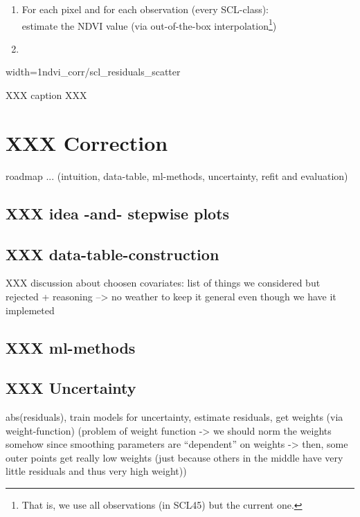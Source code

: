{    \begin{enumerate}
        \item For each pixel and for each observation (every SCL-class):\\
            estimate the NDVI value (via out-of-the-box interpolation\footnote{That is, we use all observations (in SCL45) but the current one.})
        \item
    \end{enumerate}







    \begin{my_figure}[h]{width=1\textwidth}{ndvi_corr/scl_residuals_scatter}
        \caption{XXX caption XXX}
        \label{fig:ndvi_corr/scl_residuals_scatter}
    \end{my_figure}
}



\section{XXX Correction}{
    roadmap ... (intuition, data-table, ml-methods, uncertainty, refit and evaluation)

    \subsection{XXX idea -and- stepwise plots}
    
    \subsection{XXX data-table-construction}
        \label{sec:corr_data_table}
        XXX discussion about choosen covariates:
        list of things we considered but rejected + reasoning --> no weather to keep it general even though we have it implemeted

    \subsection{XXX ml-methods}{
        
    }
    
    \subsection{XXX Uncertainty}
    abs(residuals), train models for uncertainty, estimate residuals, get weights (via weight-function)  (problem of weight function -> we should norm the weights somehow since smoothing parameters are ``dependent'' on weights -> then, some outer points get really low weights (just because others in the middle have very little residuals and thus very high weight))
    
}



